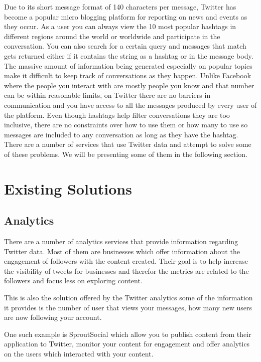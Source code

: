 Due to its short message format of 140 characters per message, Twitter has become a popular micro blogging platform for reporting on news and events as they occur.
As a user you can always view the 10 most popular hashtags in different regions around the world or worldwide and participate in the conversation. You can also search for a certain query and messages that match gets returned either if it contains the string as a hashtag or in the message body.
\newline
The massive amount of information being generated especially on popular topics make it difficult to keep track of conversations as they happen. Unlike Facebook where the people you interact with are mostly people you know and that number can be within reasonable limits, on Twitter there are no barriers in communication and you have access to all the messages produced by every user of the platform. Even though hashtags help filter conversations they are too inclusive, there are no constraints over how to use them or how many to use so messages are included to any conversation as long as they have the hashtag.
\newline
There are a number of services that use Twitter data and attempt to solve some of these problems. We will be presenting some of them in the following section.

\section{Existing Solutions}
\label{sec:ES}

\subsection{Analytics}
\label{sub-sec:analytics}

There are a number of analytics services that provide information regarding Twitter data. Most of them are businesses which offer information about the engagement of followers with the content created. Their goal is to help increase the visibility of tweets for businesses and therefor the metrics are related to the followers and focus less on exploring content. 



This is also the solution offered by the Twitter analytics  some of the information it provides is the number of user that views your messages, how many new users are now following your account.

One such example is SproutSocial  which allow you to publish content from their application to Twitter, monitor your content for engagement and offer analytics on the users which interacted with your content.

